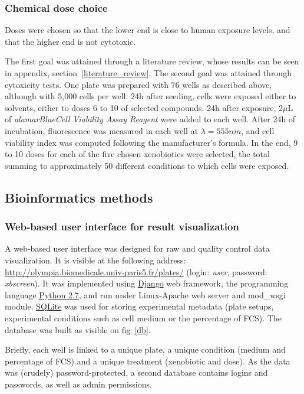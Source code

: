 \subsubsection{Chemical dose choice}
Doses were chosen so that the lower end is close to human exposure levels, and that the higher end is not cytotoxic.

The first goal was attained through a literature review, whose results can be seen in appendix, section~\ref{literature_review}. The second goal was attained through cytoxicity tests. One plate was prepared with 76 wells as described above, although with 5,000 cells per well. 24h after seeding, cells were exposed either to solvents, either to doses 6 to 10 of selected compounds. 24h after exposure, 2$\mu$L of \textit{alamarBlue\texttrademark Cell Viability Assay Reagent} were added to each well. After 24h of incubation, fluorescence was measured in each well at $\lambda = 555nm$, and cell viability index was computed following the manufacturer's formula. In the end, 9 to 10 doses for each of the five chosen xenobiotics were selected, the total summing to approximately 50 different conditions to which cells were exposed.

\subsection{Bioinformatics methods}
\label{interface}
\subsubsection{Web-based user interface for result visualization}  A web-based user interface was designed for raw  and quality control data visualization. It is visible at the following address: \href{http://olympia.biomedicale.univ-paris5.fr/plates/}{http://olympia.biomedicale.univ-paris5.fr/plates/} (login: \textit{user}, password: \textit{xbscreen}). It was implemented using \href{https://www.djangoproject.com/}{Django} web framework, the programming language \href{http://www.python.org}{Python 2.7}, and run under Linux-Apache web server and mod\_wsgi module. \href{https://sqlite.org/}{SQLite} was used for storing experimental metadata (plate setups, experimental conditions such as cell medium or the percentage of FCS). The database was built as visible on fig~\ref{db}.

Briefly, each well is linked to a unique plate, a unique condition (medium and percentage of FCS) and a unique treatment (xenobiotic and dose). As the data was (crudely) password-protected, a second database contains logins and passwords, as well as admin permissions.

